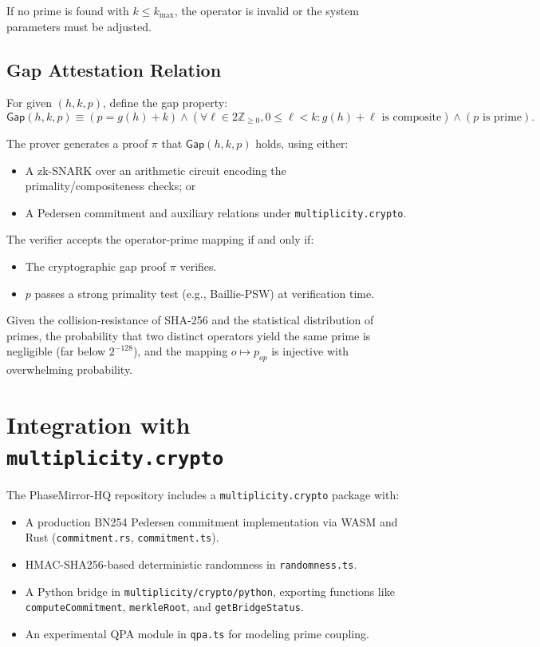 \documentclass[11pt]{article}
\begin{document}
If no prime is found with \( k \le k_{\max} \), the operator is invalid or the system parameters must be adjusted.

\subsection{Gap Attestation Relation}

For given \( (h, k, p) \), define the gap property:
\[
  \mathsf{Gap}(h,k,p) \equiv
  \left(
    p = g(h) + k
  \right)
  \land
  \left(
    \forall \ell \in 2\mathbb{Z}_{\ge 0}, 0 \le \ell < k :
    g(h)+\ell \text{ is composite}
  \right)
  \land
  \left(
    p \text{ is prime}
  \right).
\]

The prover generates a proof \( \pi \) that \( \mathsf{Gap}(h,k,p) \) holds, using either:
\begin{itemize}[leftmargin=*]
  \item A zk-SNARK over an arithmetic circuit encoding the primality/compositeness checks; or
  \item A Pedersen commitment and auxiliary relations under \texttt{multiplicity.crypto}.
\end{itemize}

The verifier accepts the operator-prime mapping if and only if:

\begin{itemize}[leftmargin=*]
  \item The cryptographic gap proof \( \pi \) verifies.
  \item \( p \) passes a strong primality test (e.g., Baillie-PSW) at verification time.
\end{itemize}

Given the collision-resistance of SHA-256 and the statistical distribution of primes, the probability that two distinct operators yield the same prime is negligible (far below \( 2^{-128} \)), and the mapping \( o \mapsto p_{op} \) is injective with overwhelming probability.

\section{Integration with \texttt{multiplicity.crypto}}

The PhaseMirror-HQ repository includes a \texttt{multiplicity.crypto} package with:

\begin{itemize}[leftmargin=*]
  \item A production BN254 Pedersen commitment implementation via WASM and Rust (\texttt{commitment.rs}, \texttt{commitment.ts}).
  \item HMAC-SHA256-based deterministic randomness in \texttt{randomness.ts}.
  \item A Python bridge in \texttt{multiplicity/crypto/python}, exporting functions like \texttt{computeCommitment}, \texttt{merkleRoot}, and \texttt{getBridgeStatus}.
  \item An experimental QPA module in \texttt{qpa.ts} for modeling prime coupling.
\end{itemize}
\end{document}

